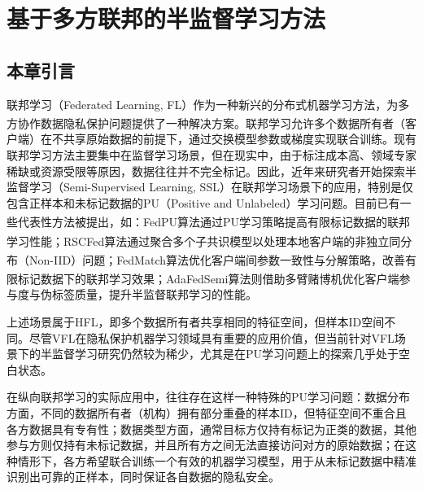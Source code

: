 \chapter{基于多方联邦的半监督学习方法} %

\thispagestyle{others} %

\pagestyle{others} %

\xiaosi %


\section{本章引言}
联邦学习（Federated Learning, FL）作为一种新兴的分布式机器学习方法，为多方协作数据隐私保护问题提供了一种解决方案\textsuperscript{\cite{mcmahan2017communication}}。联邦学习允许多个数据所有者（客户端）在不共享原始数据的前提下，通过交换模型参数或梯度实现联合训练。现有联邦学习方法主要集中在监督学习场景，但在现实中，由于标注成本高、领域专家稀缺或资源受限等原因，数据往往并不完全标记。因此，近年来研究者开始探索半监督学习（Semi-Supervised Learning, SSL）在联邦学习场景下的应用，特别是仅包含正样本和未标记数据的PU（Positive and Unlabeled）学习问题。目前已有一些代表性方法被提出，如：FedPU算法\textsuperscript{\cite{lin2022federated}}通过PU学习策略提高有限标记数据的联邦学习性能；RSCFed算法\textsuperscript{\cite{liang2022rscfed}}通过聚合多个子共识模型以处理本地客户端的非独立同分布（Non-IID）问题；FedMatch算法\textsuperscript{\cite{jeong2020federated}}优化客户端间参数一致性与分解策略，改善有限标记数据下的联邦学习效果；AdaFedSemi算法\textsuperscript{\cite{wang2022enhancing}}则借助多臂赌博机优化客户端参与度与伪标签质量，提升半监督联邦学习的性能。

上述场景属于HFL，即多个数据所有者共享相同的特征空间，但样本ID空间不同。尽管VFL在隐私保护机器学习领域具有重要的应用价值，但当前针对VFL场景下的半监督学习研究仍然较为稀少，尤其是在PU学习问题上的探索几乎处于空白状态。

在纵向联邦学习的实际应用中，往往存在这样一种特殊的PU学习问题：数据分布方面，不同的数据所有者（机构）拥有部分重叠的样本ID，但特征空间不重合且各方数据具有专有性；数据类型方面，通常目标方仅持有标记为正类的数据，其他参与方则仅持有未标记数据，并且所有方之间无法直接访问对方的原始数据；在这种情形下，各方希望联合训练一个有效的机器学习模型，用于从未标记数据中精准识别出可靠的正样本，同时保证各自数据的隐私安全。

